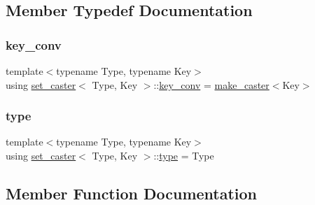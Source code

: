 \subsection{Member Typedef Documentation}
\mbox{\label{structset__caster_a16e9230a0e2ba8cd50428f75dcb9660f}} 
\subsubsection{\texorpdfstring{key\_conv}{key\_conv}}
{\footnotesize\ttfamily template$<$typename Type, typename Key$>$ \\
using \mbox{\hyperlink{structset__caster}{set\+\_\+caster}}$<$ Type, Key $>$\+::\mbox{\hyperlink{structset__caster_a16e9230a0e2ba8cd50428f75dcb9660f}{key\+\_\+conv}} =  \mbox{\hyperlink{cast_8h_ab32b52411a6b07420516d79074815713}{make\+\_\+caster}}$<$Key$>$}

\mbox{\label{structset__caster_af955f5e8e104168a805e74992fc5fc63}} 
\subsubsection{\texorpdfstring{type}{type}}
{\footnotesize\ttfamily template$<$typename Type, typename Key$>$ \\
using \mbox{\hyperlink{structset__caster}{set\+\_\+caster}}$<$ Type, Key $>$\+::\mbox{\hyperlink{structset__caster_af955f5e8e104168a805e74992fc5fc63}{type}} =  Type}



\subsection{Member Function Documentation}
\mbox{\label{structset__caster_a28ff3fb56435999d7019c7f59e43a081}} 
